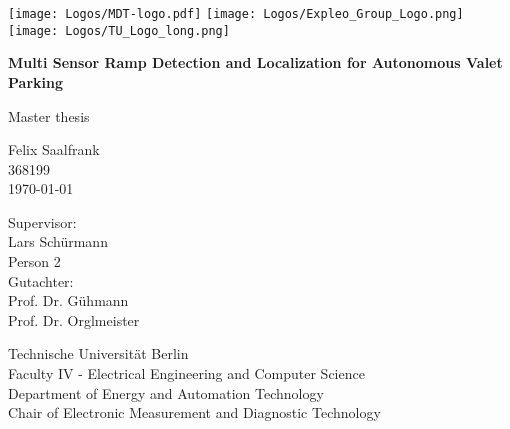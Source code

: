 \begin{titlepage}
	\begin{center} %
		\texttt{[image: Logos/MDT-logo.pdf]}
		\hspace*{0.5cm}
		\texttt{[image: Logos/Expleo\_Group\_Logo.png]}
		\hspace*{0.5cm}
		\texttt{[image: Logos/TU\_Logo\_long.png]}
		\vspace*{1cm} %

		\Huge
		\textbf{Multi Sensor Ramp Detection and Localization for Autonomous Valet Parking}

		\vspace{0.5cm}
		Master thesis

		\vspace{1.5cm}
		\LARGE{Felix Saalfrank}\\
		\large 368199\\
		\vspace{1cm}
		\today

		\vspace{1.5cm}

		Supervisor:\\
		Lars Sch\"urmann\\
		Person 2\\
		Gutachter:\\
		Prof. Dr. G\"uhmann\\
		Prof. Dr. Orglmeister

		\vfill

		\vspace{0.8cm}

		Technische Universit\"at Berlin\\
		Faculty IV - Electrical Engineering and Computer Science\\
		Department of Energy and Automation Technology\\
		Chair of Electronic Measurement and Diagnostic Technology\\
	\end{center}
\end{titlepage}
